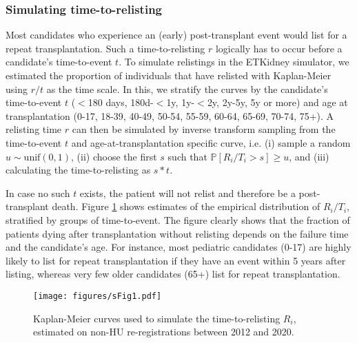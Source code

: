 \subsubsection{Simulating time-to-relisting}
\label{subsection:sim_time_to_relist}
Most candidates who experience an (early) post-transplant event would list for a repeat transplantation. Such a time-to-relisting $r$ logically has to occur before a candidate's time-to-event $t$. To simulate relistings in the ETKidney simulator, we estimated the proportion of individuals that have relisted with Kaplan-Meier using $r/t$ as the time scale. In this, we stratify the curves by the candidate's time-to-event $t$ ($<$180 days, 180d-$<$1y, 1y-$<$2y, 2y-5y, 5y or more) and age at transplantation (0-17, 18-39, 40-49, 50-54, 55-59, 60-64, 65-69, 70-74, 75+). A relisting time $r$ can then be simulated by inverse transform sampling from the time-to-event $t$ and age-at-transplantation specific curve, i.e. (i) sample a random $u \sim \text{unif}(0,1)$, (ii) choose the first $s$ such that $\mathbb{P}[R_i/T_i > s] \geq u$, and (iii) calculating the time-to-relisting as $s*t$.
\par
In case no such $t$ exists, the patient will not relist and therefore be a post-transplant death. Figure \ref{fig:posttxp_surv} shows estimates of the empirical distribution of $R_i/T_i$, stratified by groups of time-to-event. The figure clearly shows that the fraction of patients dying after transplantation without relisting depends on the failure time and the candidate's age. For instance, most pediatric candidates (0-17) are highly likely to list for repeat transplantation if they have an event within 5 years after listing, whereas very few older candidates (65+) list for repeat transplantation.
\begin{figure}[h]
	\centering
	\texttt{[image: figures/sFig1.pdf]}
	\caption{Kaplan-Meier curves used to simulate the time-to-relisting $R_i$, estimated on non-HU re-registrations between 2012 and 2020.}
	\label{fig:posttxp_surv}
\end{figure}
\FloatBarrier
